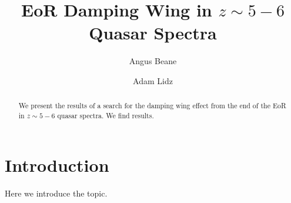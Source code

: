 \documentclass[twocolumn]{aastex62}
\begin{document}
\title{EoR Damping Wing in $z\sim5-6$ Quasar Spectra}


\author{Angus Beane}
\affil{\upenn}

\author{Adam Lidz}
\affil{\upenn}

\begin{abstract}

We present the results of a search for the damping wing effect from the end of
the EoR in $z\sim5-6$ quasar spectra. We find results.

\end{abstract}


\section{Introduction} \label{sec:intro}
Here we introduce the topic.
\end{document}
